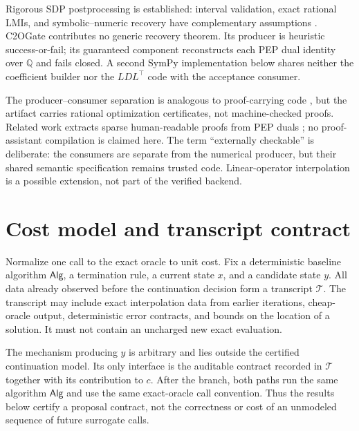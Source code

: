 \documentclass[smallextended]{svjour3}
\newcommand{\cT}{\mathcal{T}}
\newcommand{\Alg}{\mathsf{Alg}}
\begin{document}
Rigorous SDP postprocessing is established: interval validation, exact rational
LMIs, and symbolic--numeric recovery have complementary assumptions
\citep{JanssonVSDP2006,HenrionNaldiSafeyElDin2016,PeyrlParrilo2008,
DavisPapp2022}.  C2OGate contributes no generic recovery theorem.  Its producer
is heuristic success-or-fail; its guaranteed component reconstructs each PEP
dual identity over $\mathbb Q$ and fails closed.  A second SymPy implementation
below shares neither the coefficient builder nor the $LDL^\top$ code with the
acceptance consumer.

The producer--consumer separation is analogous to proof-carrying code
\citep{Necula1997}, but the artifact carries rational optimization
certificates, not machine-checked proofs.  Related work extracts sparse
human-readable proofs from PEP duals \citep{ThomsenEtAl2026}; no proof-assistant
compilation is claimed here.  The term ``externally checkable'' is deliberate:
the consumers are separate from the numerical producer, but their shared
semantic specification remains trusted code.  Linear-operator interpolation
\citep{Bousselmi2024} is a possible extension, not part of the verified backend.

\section{Cost model and transcript contract}
\label{sec:model}

Normalize one call to the exact oracle to unit cost.  Fix a deterministic
baseline algorithm $\Alg$, a termination rule, a current state $x$, and
a candidate state $y$.  All data already observed before the continuation decision
form a transcript $\cT$.  The transcript may include exact interpolation data
from earlier iterations, cheap-oracle output, deterministic error contracts,
and bounds on the location of a solution.  It must not contain an uncharged
new exact evaluation.

The mechanism producing $y$ is arbitrary and lies outside the certified
continuation model.  Its only interface is the auditable contract recorded in
$\cT$ together with its contribution to $c$.  After the branch, both paths run
the same algorithm $\Alg$ and use the same exact-oracle call convention.
Thus the results below certify a proposal contract, not the correctness or
cost of an unmodeled sequence of future surrogate calls.
\end{document}
